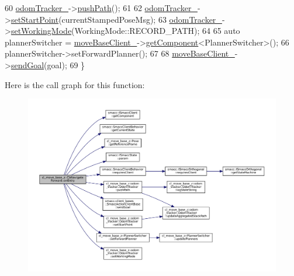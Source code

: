 \begin{DoxyCode}
60     \hyperlink{classcl__move__base__z_1_1CbNavigateForward_a7583a4d669af48618bd45950db8e5292}{odomTracker\_}->\hyperlink{classcl__move__base__z_1_1odom__tracker_1_1OdomTracker_a205ee48ec8b4599658e7408fc4755239}{pushPath}();
61 
62     \hyperlink{classcl__move__base__z_1_1CbNavigateForward_a7583a4d669af48618bd45950db8e5292}{odomTracker\_}->\hyperlink{classcl__move__base__z_1_1odom__tracker_1_1OdomTracker_a9f4989c6353022c2ec3b0546c09bf3bc}{setStartPoint}(currentStampedPoseMsg);
63     \hyperlink{classcl__move__base__z_1_1CbNavigateForward_a7583a4d669af48618bd45950db8e5292}{odomTracker\_}->\hyperlink{classcl__move__base__z_1_1odom__tracker_1_1OdomTracker_aeed01bdefd9a1cc709b0b3e4eed285ed}{setWorkingMode}(WorkingMode::RECORD\_PATH);
64 
65     \textcolor{keyword}{auto} plannerSwitcher = \hyperlink{classcl__move__base__z_1_1CbNavigateForward_a128b88b91b3f600f5a28480d85405c16}{moveBaseClient\_}->\hyperlink{classsmacc_1_1ISmaccClient_adef78db601749ca63c19e74a27cb88cc}{getComponent}<PlannerSwitcher>();
66     plannerSwitcher->setForwardPlanner();
67 
68     \hyperlink{classcl__move__base__z_1_1CbNavigateForward_a128b88b91b3f600f5a28480d85405c16}{moveBaseClient\_}->\hyperlink{classsmacc_1_1client__bases_1_1SmaccActionClientBase_a9c47a5094ac8afb01680307fe5eca922}{sendGoal}(goal);
69 \}
\end{DoxyCode}
Here is the call graph for this function\+:
\nopagebreak
\begin{figure}[H]
\begin{center}
\leavevmode
\includegraphics[width=350pt]{classcl__move__base__z_1_1CbNavigateForward_af9a2e49071de287922c3f5963a079b95_cgraph}
\end{center}
\end{figure}
\mbox{\label{classcl__move__base__z_1_1CbNavigateForward_a2160484562ef5fb1c655fab7f990241e}} 
